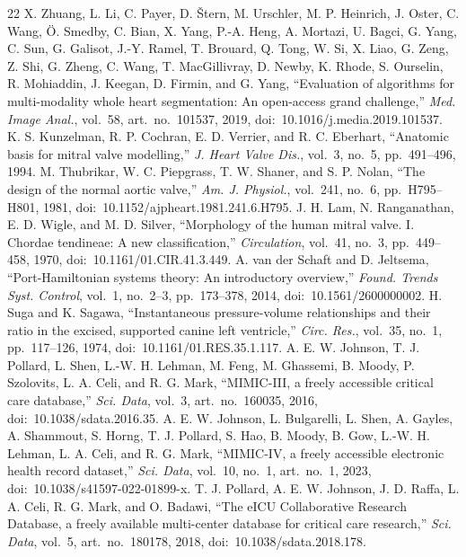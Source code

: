 \documentclass[journal]{IEEEtran}
\begin{document}
\begin{thebibliography}{22}
 X. Zhuang, L. Li, C. Payer, D. \v{S}tern, M. Urschler, M. P. Heinrich, J. Oster, C. Wang, \"{O}. Smedby, C. Bian, X. Yang, P.-A. Heng, A. Mortazi, U. Bagci, G. Yang, C. Sun, G. Galisot, J.-Y. Ramel, T. Brouard, Q. Tong, W. Si, X. Liao, G. Zeng, Z. Shi, G. Zheng, C. Wang, T. MacGillivray, D. Newby, K. Rhode, S. Ourselin, R. Mohiaddin, J. Keegan, D. Firmin, and G. Yang, ``Evaluation of algorithms for multi-modality whole heart segmentation: An open-access grand challenge,'' \emph{Med. Image Anal.}, vol.~58, art.~no.~101537, 2019, doi:~10.1016/j.media.2019.101537.
 K. S. Kunzelman, R. P. Cochran, E. D. Verrier, and R. C. Eberhart, ``Anatomic basis for mitral valve modelling,'' \emph{J. Heart Valve Dis.}, vol.~3, no.~5, pp.~491--496, 1994.
 M. Thubrikar, W. C. Piepgrass, T. W. Shaner, and S. P. Nolan, ``The design of the normal aortic valve,'' \emph{Am. J. Physiol.}, vol.~241, no.~6, pp.~H795--H801, 1981, doi:~10.1152/ajpheart.1981.241.6.H795.
 J. H. Lam, N. Ranganathan, E. D. Wigle, and M. D. Silver, ``Morphology of the human mitral valve. I. Chordae tendineae: A new classification,'' \emph{Circulation}, vol.~41, no.~3, pp.~449--458, 1970, doi:~10.1161/01.CIR.41.3.449.
 A. van der Schaft and D. Jeltsema, ``Port-Hamiltonian systems theory: An introductory overview,'' \emph{Found. Trends Syst. Control}, vol.~1, no.~2--3, pp.~173--378, 2014, doi:~10.1561/2600000002.
 H. Suga and K. Sagawa, ``Instantaneous pressure-volume relationships and their ratio in the excised, supported canine left ventricle,'' \emph{Circ. Res.}, vol.~35, no.~1, pp.~117--126, 1974, doi:~10.1161/01.RES.35.1.117.
 A. E. W. Johnson, T. J. Pollard, L. Shen, L.-W. H. Lehman, M. Feng, M. Ghassemi, B. Moody, P. Szolovits, L. A. Celi, and R. G. Mark, ``MIMIC-III, a freely accessible critical care database,'' \emph{Sci. Data}, vol.~3, art.~no.~160035, 2016, doi:~10.1038/sdata.2016.35.
 A. E. W. Johnson, L. Bulgarelli, L. Shen, A. Gayles, A. Shammout, S. Horng, T. J. Pollard, S. Hao, B. Moody, B. Gow, L.-W. H. Lehman, L. A. Celi, and R. G. Mark, ``MIMIC-IV, a freely accessible electronic health record dataset,'' \emph{Sci. Data}, vol.~10, no.~1, art.~no.~1, 2023, doi:~10.1038/s41597-022-01899-x.
 T. J. Pollard, A. E. W. Johnson, J. D. Raffa, L. A. Celi, R. G. Mark, and O. Badawi, ``The eICU Collaborative Research Database, a freely available multi-center database for critical care research,'' \emph{Sci. Data}, vol.~5, art.~no.~180178, 2018, doi:~10.1038/sdata.2018.178.

\end{thebibliography}
\end{document}
